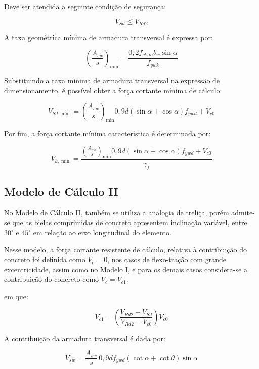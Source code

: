 Deve ser atendida a seguinte condição de segurança:

\begin{equation}
V_{Sd} \leq V_{Rd2}
\end{equation}

A taxa geométrica mínima de armadura transversal é expressa por:

\begin{equation}
\left(\frac{A_{sw}}{s}\right)_{\min} =
\frac{0,2f_{ct,m}b_w\sin\alpha}{f_{ywk}}
\end{equation}

Substituindo a taxa mínima de armadura transversal na expressão de dimensionamento, é possível obter a força cortante mínima de cálculo:

\begin{equation}
V_{Sd,\min} =
\left(\frac{A_{sw}}{s}\right)_{\min}
0,9d(\sin\alpha+\cos\alpha)f_{ywd}
+V_{c0}
\end{equation}

Por fim, a força cortante mínima característica é determinada por:

\begin{equation}
V_{k,\min} =
\frac{
\left(\frac{A_{sw}}{s}\right)_{\min}
0,9d(\sin\alpha+\cos\alpha)f_{ywd}
+V_{c0}
}{\gamma_f}
\end{equation}


\subsection{Modelo de Cálculo II}

No Modelo de Cálculo II, também se utiliza a analogia de treliça, porém admite-se que as bielas comprimidas de concreto apresentem inclinação variável, entre \(30^\circ\) e \(45^\circ\) em relação ao eixo longitudinal do elemento.

Nesse modelo, a força cortante resistente de cálculo, relativa à contribuição do concreto foi definida como $V_c = 0$, nos casos de flexo-tração com grande excentricidade, assim como no Modelo I, e para os demais casos considera-se a contribuição do concreto como $V_c = V_{c1}$.

em que:

\begin{equation}
V_{c1} =
\left(
\frac{V_{Rd2}-V_{Sd}}
{V_{Rd2}-V_{c0}}
\right)V_{c0}
\end{equation}

A contribuição da armadura transversal é dada por:

\begin{equation}
V_{sw} =
\frac{A_{sw}}{s}
\,0,9d f_{ywd}
(\cot\alpha+\cot\theta)\sin\alpha
\end{equation}

